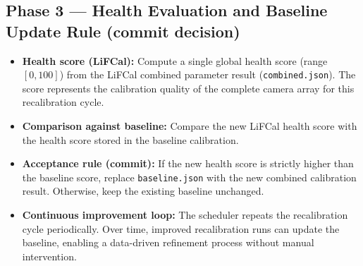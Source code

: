 \documentclass[12pt]{scrartcl}
\begin{document}
\subsection*{Phase 3 — Health Evaluation and Baseline Update Rule (commit decision)}
\begin{itemize}
  \item \textbf{Health score (LiFCal):}
  Compute a single global health score (range $[0,100]$) from the LiFCal combined parameter result (\texttt{combined.json}).
  The score represents the calibration quality of the complete camera array for this recalibration cycle.

  \item \textbf{Comparison against baseline:}
  Compare the new LiFCal health score with the health score stored in the baseline calibration.

  \item \textbf{Acceptance rule (commit):}
  If the new health score is strictly higher than the baseline score, replace \texttt{baseline.json}
  with the new combined calibration result. Otherwise, keep the existing baseline unchanged.

  \item \textbf{Continuous improvement loop:}
  The scheduler repeats the recalibration cycle periodically. Over time, improved recalibration runs can update the baseline,
  enabling a data-driven refinement process without manual intervention.
\end{itemize}
\end{document}
